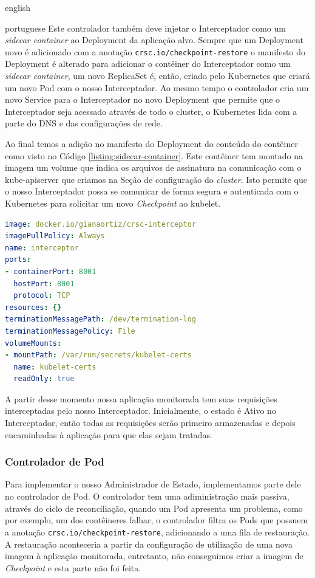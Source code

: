\begin{otherlanguage*}{english}
\begin{otherlanguage*}{portuguese}
Este controlador também deve injetar o Interceptador como um \textit{sidecar container}
ao Deployment da aplicação alvo. Sempre que um Deployment novo é adicionado com a 
anotação \texttt{crsc.io/checkpoint-restore} o manifesto do Deployment é alterado
para adicionar o contêiner do Interceptador como um \textit{sidecar container}, um novo
ReplicaSet é, então, criado pelo Kubernetes que criará um novo Pod com o nosso
Interceptador. Ao mesmo tempo o controlador cria um novo Service para o Interceptador no
novo Deployment que permite que o Interceptador seja acessado através de todo o cluster, o
Kubernetes lida com a parte do DNS e das configurações de rede.

Ao final temos a adição no manifesto do Deployment do conteúdo do contêiner como visto no
Código \ref{listing:sidecar-container}. Este contêiner tem montado na imagem um volume
que indica os arquivos de assinatura na comunicação com o kube-apiserver que criamos na
Seção de configuração do \textit{cluster}. Isto permite que o nosso Interceptador possa
se comunicar de forma segura e autenticada com o Kubernetes para solicitar um novo
\textit{Checkpoint} ao kubelet.

\begin{lstlisting}[language=yaml,caption={Configuração do Interceptador para o Deployment da aplicação alvo como sidecar container.},label={listing:sidecar-container}]
image: docker.io/gianaortiz/crsc-interceptor
imagePullPolicy: Always
name: interceptor
ports:
- containerPort: 8001
  hostPort: 8001
  protocol: TCP
resources: {}
terminationMessagePath: /dev/termination-log
terminationMessagePolicy: File
volumeMounts:
- mountPath: /var/run/secrets/kubelet-certs
  name: kubelet-certs
  readOnly: true
\end{lstlisting}

A partir desse momento nossa aplicação monitorada tem suas requisições interceptadas
pelo nosso Interceptador. Inicialmente, o estado é Ativo no Interceptador, então todas
as requisições serão primeiro armazenadas e depois encaminhadas à aplicação para que
elas sejam tratadas.

\subsubsection{Controlador de Pod}

Para implementar o nosso Administrador de Estado, implementamos parte dele no controlador
de Pod. O controlador tem uma adiministração mais passiva, através do ciclo de
reconciliação, quando um Pod apresenta um problema, como por exemplo, um dos contêineres
falhar, o controlador filtra os Pods que possuem a anotação
\texttt{crsc.io/checkpoint-restore}, adicionando a uma fila de restauração.
A restauração aconteceria a partir da configuração de utilização de uma nova
imagem à aplicação monitorada, entretanto, não conseguimos criar a imagem de
\textit{Checkpoint} e esta parte não foi feita.


\end{otherlanguage*}
\end{otherlanguage*}
